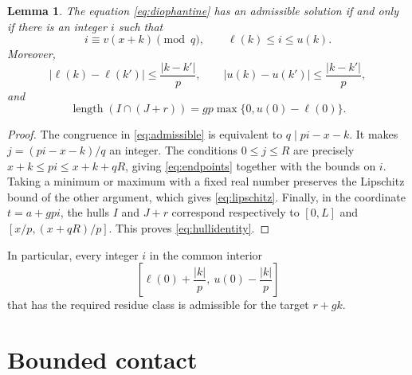 \documentclass[11pt,leqno]{amsart}
\numberwithin{equation}{section}
\newtheorem{lemma}[theorem]{Lemma}
\theoremstyle{definition}
\theoremstyle{remark}
\newcommand{\len}{\operatorname{length}}
\begin{document}
\begin{lemma}\label{lem:congruence}
The equation \eqref{eq:diophantine} has an admissible solution if and only if there is an integer $i$ such that
\begin{equation}\label{eq:admissible}
i\equiv v(x+k)\pmod q,
\qquad \ell(k)\le i\le u(k).
\end{equation}
Moreover,
\begin{equation}\label{eq:lipschitz}
|\ell(k)-\ell(k')|\le\frac{|k-k'|}{p},
\qquad
|u(k)-u(k')|\le\frac{|k-k'|}{p},
\end{equation}
and
\begin{equation}\label{eq:hullidentity}
\len(I\cap(J+r))=gp\max\{0,u(0)-\ell(0)\}.
\end{equation}
\end{lemma}
\begin{proof}
The congruence in \eqref{eq:admissible} is equivalent to $q\mid pi-x-k$. It makes $j=(pi-x-k)/q$ an integer. The conditions $0\le j\le R$ are precisely
$x+k\le pi\le x+k+qR$, giving \eqref{eq:endpoints} together with the bounds on $i$. Taking a minimum or maximum with a fixed real number preserves the Lipschitz bound of the other argument, which gives \eqref{eq:lipschitz}. Finally, in the coordinate $t=a+gpi$, the hulls $I$ and $J+r$ correspond respectively to $[0,L]$ and $[x/p,(x+qR)/p]$. This proves \eqref{eq:hullidentity}.
\end{proof}

In particular, every integer $i$ in the common interior
\begin{equation}\label{eq:commoninterior}
\left[\ell(0)+\frac{|k|}{p},\ u(0)-\frac{|k|}{p}\right]
\end{equation}
that has the required residue class is admissible for the target $r+gk$.

\section{Bounded contact}
\end{document}
